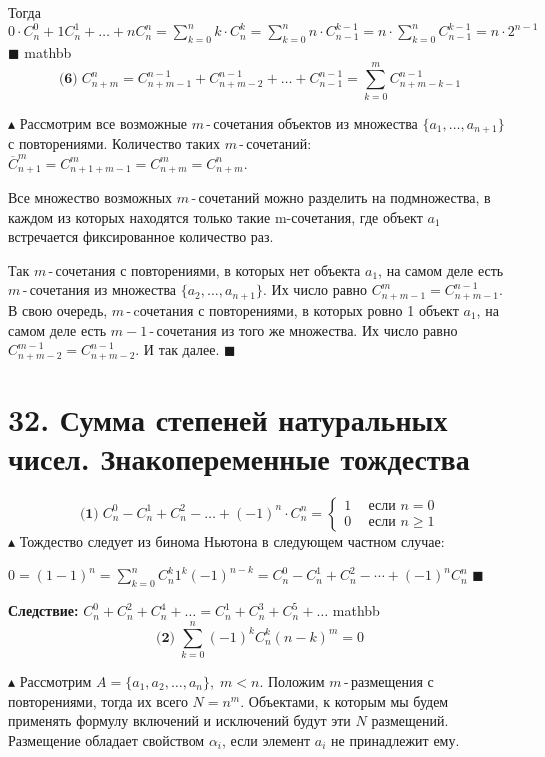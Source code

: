 Тогда  $0\cdot C_n^0 + 1C_n^1 + \ldots + nC_n^n = \sum_{k=0}^nk\cdot C_n^k = \sum_{k=0}^nn\cdot C_{n-1}^{k-1} = n\cdot\sum_{k=0}^nC_{n-1}^{k-1} =  n\cdot2^{n-1}$ \quad $\blacksquare$
mathbb $$\textbf{(6)} \; C_{n+m}^n = C_{n+m-1}^{n-1} + C_{n+m-2}^{n-1} + \ldots + C_{n-1}^{n-1} = \sum_{k=0}^mC_{n+m-k-1}^{n-1}$$


$\blacktriangle$ Рассмотрим все возможные $m$\,-\,сочетания объектов из множества $\{a_1,\ldots,a_{n+1}\}$ с повторениями. Количество таких $m$\,-\,сочетаний: $\overline C_{n+1}^m = C_{n+1+m-1}^{m} = C_{n+m}^{m} = C_{n+m}^{n}$. 

Все множество возможных $m$\,-\,сочетаний можно разделить на подмножества, в каждом из которых находятся только такие m-сочетания, где объект $a_1$ встречается фиксированное количество раз.


Так $m$\,-\,сочетания с повторениями, в которых нет объекта $a_1$, на самом деле есть $m$\,-\,сочетания из множества $\{a_2,\ldots,a_{n+1}\}$. Их число равно $C_{n+m-1}^m=C_{n+m-1}^{n-1}$. В свою очередь, $m$\,-\,cочетания с повторениями, в которых ровно 1 объект $a_1$, на самом деле есть $m-1$\,-\,сочетания из того же множества. Их число равно $C_{n+m-2}^{m-1}=C_{n+m-2}^{n-1}$. И так далее. \quad $\blacksquare$

\section*{32. Сумма степеней натуральных чисел. Знакопеременные тождества }

$$\textbf{(1)} \; C_n^0 - C_n^1 + C_n^2 - \ldots + (-1)^n \cdot C_n^n = \begin{cases}
1  & \:\: \text{если } n=0\\
0  & \:\: \text{если } n\geq1
\end{cases}$$
$\blacktriangle$ Тождество следует из бинома Ньютона в следующем частном случае: 

$0 = (1-1)^n = \sum_{k=0}^n C_n^k 1^k (-1)^{n-k} = C_n^0 - C_n^1 + C_n^2 - \dotsb + (-1)^n C_n^n$  $\blacksquare$

\textbf{Следствие:} $C_n^0 + C_n^2 + C_n^4 + \ldots = C_n^1 + C_n^3 + C_n^5 + \ldots$
mathbb $$\textbf{(2)} \; \sum_{k=0}^n(-1)^kC_n^k(n-k)^m = 0$$


$\blacktriangle$ Рассмотрим $A = \{a_1, a_2, \ldots, a_n\}, \; m<n$. Положим $m$\,-\,размещения с повторениями, тогда их всего $N=n^m$. Объектами, к которым мы будем применять формулу включений и исключений будут эти $N$ размещений. Размещение обладает свойством $\alpha_i$, если элемент $a_i$ не принадлежит ему. 

